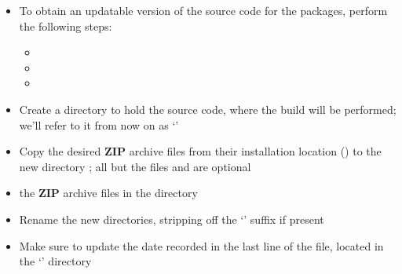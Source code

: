 \begin{itemize}
\begin{itemize}
\item\exSp{}
\item\exSp{}
\item\exSp{}
\item\exSp{}
\end{itemize}
\item\exSp{}To obtain an updatable version of the source code for the packages, perform
the following steps:
\begin{itemize}
\item {}
\item\exSp{}
\item\exSp{}
\end{itemize}
\end{itemize}
\secondaryEnd
\tertiaryEnd
{}
\begin{itemize}
\item Create a directory to hold the source code, where the build will be performed; we'll
refer to it from now on as `'
\item\exSp{}Copy the desired \textbf{ZIP} archive files from their installation location
() to the
new directory ; all but the files  and
 are optional
\item\exSp{} the \textbf{ZIP} archive files in the directory
\item\exSp{}Rename the new directories, stripping off the `' suffix if
present
\item\exSp{}Make sure to update the date recorded in the last line of the
 file, located in the `' directory
\end{itemize}
\secondaryEnd
\tertiaryEnd
{}
